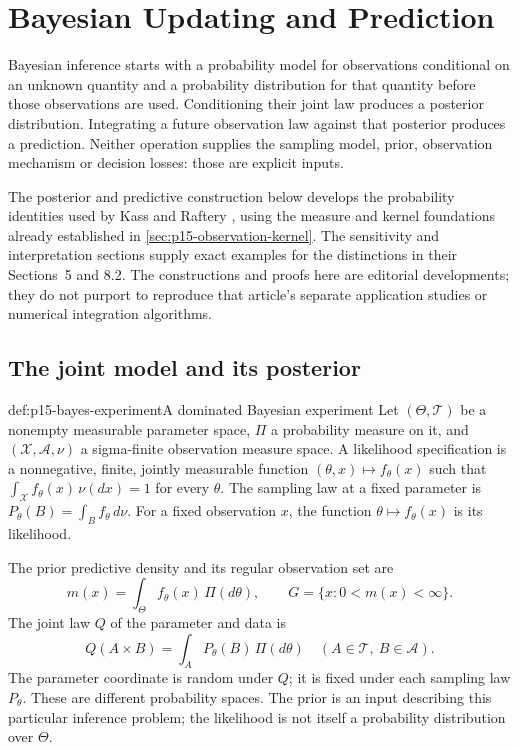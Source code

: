 \chapter{Bayesian Updating and Prediction}
\label{sec:p15-bayesian-updating-prediction}

Bayesian inference starts with a probability model for observations
conditional on an unknown quantity and a probability distribution for
that quantity before those observations are used. Conditioning their
joint law produces a posterior distribution. Integrating a future
observation law against that posterior produces a prediction. Neither
operation supplies the sampling model, prior, observation mechanism or
decision losses: those are explicit inputs.

The posterior and predictive construction below develops the probability
identities used by Kass and Raftery
\cite[secs.~3.1--3.2 and 6.1]{KassRaftery1995BayesFactors},
using the measure and kernel foundations already established in
\cref{sec:p15-observation-kernel}. The sensitivity and interpretation
sections supply exact examples for the distinctions in their
Sections~5 and 8.2. The constructions and proofs here are editorial
developments; they do not purport to reproduce that article's separate
application studies or numerical integration algorithms.

\section{The joint model and its posterior}
\label{sec:p15-bayes-joint-model}

\begin{hbdefinition}{def:p15-bayes-experiment}{A dominated Bayesian experiment}
Let \((\Theta,\mathcal T)\) be a nonempty measurable parameter space,
\(\Pi\) a probability measure on it, and \((\mathcal X,\mathcal A,\nu)\)
a sigma-finite observation measure space. A likelihood specification is
a nonnegative, finite, jointly measurable function
\((\theta,x)\mapsto f_\theta(x)\) such that
\(\int_{\mathcal X}f_\theta(x)\,\nu(dx)=1\) for every \(\theta\).
The sampling law at a fixed parameter is
\(P_\theta(B)=\int_B f_\theta\,d\nu\).
For a fixed observation \(x\), the function
\(\theta\mapsto f_\theta(x)\) is its likelihood.

The prior predictive density and its regular observation set are
\[
 m(x)=\int_\Theta f_\theta(x)\,\Pi(d\theta),
 \qquad G=\{x:0<m(x)<\infty\}.
\]
The joint law \(Q\) of the parameter and data is
\[
 Q(A\times B)=\int_A P_\theta(B)\,\Pi(d\theta)
                 \quad(A\in\mathcal T,\ B\in\mathcal A).
\]
The parameter coordinate is random under \(Q\); it is fixed under
each sampling law \(P_\theta\). These are different probability spaces.
The prior is an input describing this particular inference problem;
the likelihood is not itself a probability distribution over \(\Theta\).
\end{hbdefinition}

